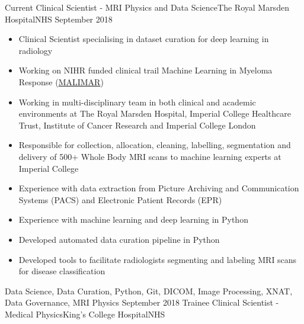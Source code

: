 %
%
%
\begin{experiences}
  \experience
    {Current}   {Clinical Scientist - MRI Physics and Data Science}{The Royal Marsden Hospital}{NHS}
    {September 2018} {
                      \begin{itemize}
                        \item Clinical Scientist specialising in dataset curation for deep learning in radiology
                        \item Working on NIHR funded clinical trail Machine Learning in Myeloma Response
                              ({\color{linkcolor}\href{https://fundingawards.nihr.ac.uk/award/16/68/34}{MALIMAR}})
                        \item Working in multi-disciplinary team in both clinical and academic environments at The Royal Marsden Hospital,
                        Imperial College Healthcare Trust, Institute of Cancer Research and Imperial College London
                        \item Responsible for collection, allocation, cleaning, labelling, segmentation and delivery of 500+
                        Whole Body MRI scans to machine learning experts at Imperial College
                        \item Experience with data extraction from Picture Archiving and Communication Systems (PACS) and
                        Electronic Patient Records (EPR)
                        \item Experience with machine learning and deep learning in Python
                        \item Developed automated data curation pipeline in Python
                        \item Developed tools to facilitate radiologists segmenting and labeling MRI scans for disease classification
                      \end{itemize}
                    }
                    {Data Science, Data Curation, Python, Git, DICOM, Image Processing, XNAT, Data Governance, MRI Physics}
  \emptySeparator
  \experience
    {September 2018} {Trainee Clinical Scientist - Medical Physics}{King's College Hospital}{NHS}

\end{experiences}
